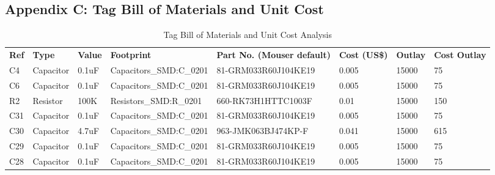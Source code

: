 \newpage
\vspace*{\fill}
\begin{center}
\subsection*{Appendix C: Tag Bill of Materials and Unit Cost}
\end{center}
\vspace*{\fill}

\begin{landscape}
\begin{table}[]
\centering
\tiny
\caption{Tag Bill of Materials and Unit Cost Analysis}
\label{bom}
\begin{tabular}{llllllll}
\textbf{Ref}   & \textbf{Type} & \textbf{Value}             & \textbf{Footprint}              & \textbf{Part No. (Mouser default)}   & \textbf{Cost (US\$)} & \textbf{Outlay} & \textbf{Cost Outlay} \\
C4             & Capacitor     & 0.1uF                      & Capacitors\_SMD:C\_0201         & 81-GRM033R60J104KE19                 & 0.005                & 15000           & 75                   \\
C6             & Capacitor     & 0.1uF                      & Capacitors\_SMD:C\_0201         & 81-GRM033R60J104KE19                 & 0.005                & 15000           & 75                   \\
R2             & Resistor      & 100K                       & Resistors\_SMD:R\_0201          & 660-RK73H1HTTC1003F                  & 0.01                 & 15000           & 150                  \\
C31            & Capacitor     & 0.1uF                      & Capacitors\_SMD:C\_0201         & 81-GRM033R60J104KE19                 & 0.005                & 15000           & 75                   \\
C30            & Capacitor     & 4.7uF                      & Capacitors\_SMD:C\_0201         & 963-JMK063BJ474KP-F                  & 0.041                & 15000           & 615                  \\
C29            & Capacitor     & 0.1uF                      & Capacitors\_SMD:C\_0201         & 81-GRM033R60J104KE19                 & 0.005                & 15000           & 75                   \\
C28            & Capacitor     & 0.1uF                      & Capacitors\_SMD:C\_0201         & 81-GRM033R60J104KE19                 & 0.005                & 15000           & 75                   \\

\end{tabular}
\end{table}
\end{landscape}
